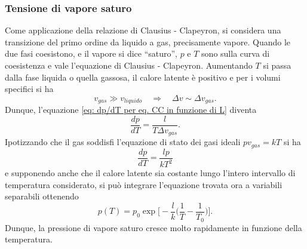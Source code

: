 \subsubsection{Tensione di vapore saturo}
Come applicazione della relazione di Clausius - Clapeyron, si considera una transizione del primo ordine da liquido a gas, precisamente vapore. Quando le due fasi coesistono, e il vapore si dice ``saturo'', $p$ e $T$ sono sulla curva di coesistenza e vale l'equazione di Clausius - Clapeyron. Aumentando $T$ si passa dalla fase liquida o quella gassosa, il calore latente è positivo e per i volumi specifici si ha
\begin{equation}
    v_{gas} \gg v_{liquido}\quad\Rightarrow\quad \Delta v \sim \Delta v_{gas}.
\end{equation}
Dunque, l'equazione \eqref{eq: dp/dT per eq. CC in funzione di L} diventa
\begin{equation}
    \frac{dp}{dT} = \frac{l}{T\Delta v_{gas}}.
\end{equation}
Ipotizzando che il gas soddisfi l'equazione di stato dei gasi ideali $pv_{gas} = kT$ si ha
\begin{equation}
    \frac{dp}{dT} = \frac{lp}{kT^2}
\end{equation}
e supponendo anche che il calore latente sia costante lungo l'intero intervallo di temperatura considerato, si può integrare l'equazione trovata ora a variabili separabili ottenendo
\begin{equation}
    p(T) = p_0\exp{\bigg[-\frac{l}{k}\bigg(\frac{1}{T} - \frac{1}{T_0}\bigg)\bigg]}.
\end{equation}
Dunque, la pressione di vapore saturo cresce molto rapidamente in funzione della temperatura.

